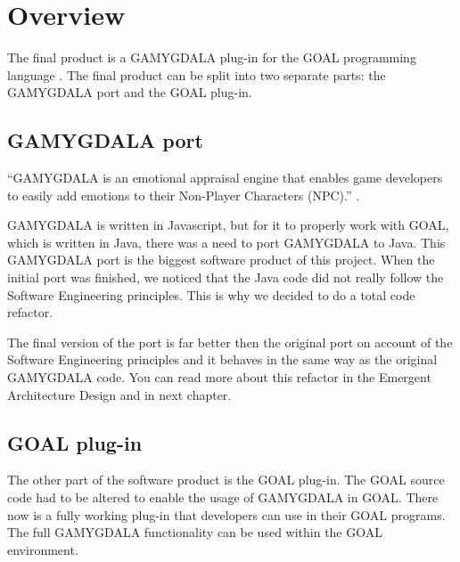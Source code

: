 \section{Overview}
The final product is a GAMYGDALA \citep{gamygdala} plug-in for the GOAL programming language \citep{goal}. The final product can be split into two separate parts: the GAMYGDALA port and the GOAL plug-in.

\subsection{GAMYGDALA port}
``GAMYGDALA is an emotional appraisal engine that enables game developers to easily add emotions to their Non-Player Characters (NPC).'' \citep{gamygdala}. \par
GAMYGDALA is written in Javascript, but for it to properly work with GOAL, which is written in Java, there was a need to port GAMYGDALA to Java. This GAMYGDALA port is the biggest software product of this project. When the initial port was finished, we noticed that the Java code did not really follow the Software Engineering principles. This is why we decided to do a total code refactor. \par 
The final version of the port is far better then the original port on account of the Software Engineering principles and it behaves in the same way as the original GAMYGDALA code. You can read more about this refactor in the Emergent Architecture Design \citep{ead} and in next chapter.

\subsection{GOAL plug-in}
The other part of the software product is the GOAL plug-in. The GOAL source code had to be altered to enable the usage of GAMYGDALA in GOAL. There now is a fully working plug-in that developers can use in their GOAL programs. The full GAMYGDALA functionality can be used within the GOAL environment.